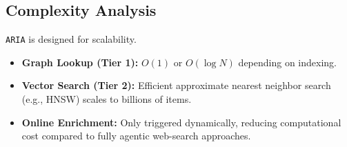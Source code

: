 \subsection{Complexity Analysis}
\label{sec:complexity}
\texttt{ARIA} is designed for scalability.
\begin{itemize}
    \item \textbf{Graph Lookup (Tier 1):} $O(1)$ or $O(\log N)$ depending on indexing.
    \item \textbf{Vector Search (Tier 2):} Efficient approximate nearest neighbor search (e.g., HNSW) scales to billions of items.
    \item \textbf{Online Enrichment:} Only triggered dynamically, reducing computational cost compared to fully agentic web-search approaches.
\end{itemize}
